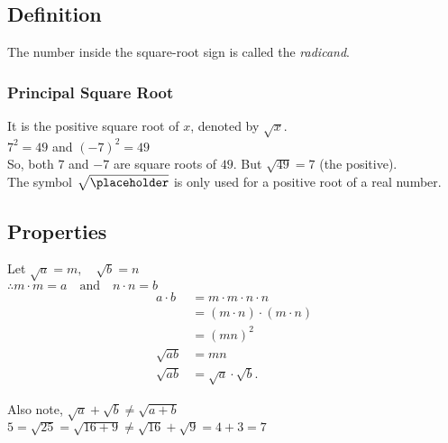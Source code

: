 \documentclass{hw}
\begin{document}
\subsection*{\normalsize Definition}

The number inside the square-root sign is called the \textit{radicand}.

\subsubsection*{\normalsize Principal Square Root}
It is the positive square root of $x$, denoted by $\sqrt{x}$. \\
$7^2 = 49$ \quad and \quad $(-7)^2 = 49$ \\
So, both $7$ and $-7$ are square roots of $49$. But $\sqrt{49} = 7$ (the positive).\\
The symbol $\sqrt{\placeholder}$ is only used for a positive root of a real number.

\subsection*{\normalsize Properties}
{\centering
{}\par}

Let $\sqrt{a} = m, \quad \sqrt{b} = n$ \\
$\therefore m \cdot m = a \quad \text{and} \quad n \cdot n = b $
\begin{align*}
a \cdot b &= m \cdot m \cdot n \cdot n \\
          &= (m \cdot n) \cdot (m \cdot n) \\
          &= (m n)^2 \\
\sqrt{a b} &= m n \\
\sqrt{a b} &= \sqrt{a} \cdot \sqrt{b}.
\end{align*}

Also note,
$\sqrt{a} + \sqrt{b} \neq \sqrt{a + b}$ \\
$5 = \sqrt{25} = \sqrt{16 + 9} \neq \sqrt{16} + \sqrt{9} = 4 + 3 = 7$
\end{document}
